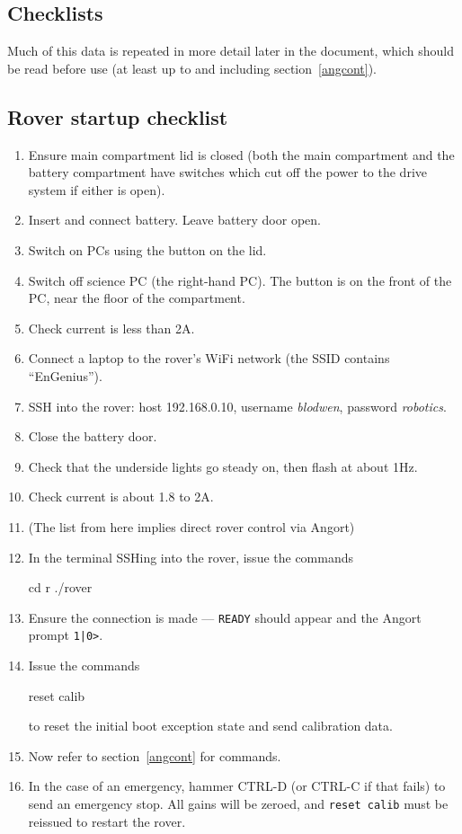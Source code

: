 \subsection{Checklists}
Much of this data is repeated in more detail later in the document,
which should be read before use (at least up to and including section~\ref{angcont}).
\subsection{Rover startup checklist}
\begin{enumerate}
\item Ensure main compartment lid is closed (both the main compartment
and the battery compartment have switches which cut off the power to
the drive system if either is open).
\item Insert and connect battery. Leave battery door open.
\item Switch on PCs using the button on the lid.
\item Switch off science PC (the right-hand PC). The button is on
the front of the PC, near the floor of the compartment.
\item Check current is less than 2A.
\item Connect a laptop to the rover's WiFi network (the SSID contains ``EnGenius'').
\item SSH into the rover: host 192.168.0.10, username \emph{blodwen}, password \emph{robotics}.
\item Close the battery door.
\item Check that the underside lights go steady on, then flash at about 1Hz.
\item Check current is about 1.8 to 2A.
\item (The list from here implies direct rover control via Angort)
\item In the terminal SSHing into the rover, issue the commands
\begin{v}
cd r
./rover
\end{v}
\item Ensure the connection is made --- \texttt{READY} should appear
and the Angort prompt \texttt{1|0>}.
\item Issue the commands
\begin{v}
reset calib
\end{v}
to reset the initial boot exception state and send calibration data.
\item Now refer to section~\ref{angcont} for commands.
\item In the case of an emergency, hammer CTRL-D (or CTRL-C if that
fails) to send an emergency stop. All gains will be zeroed, and 
\texttt{reset calib} must be reissued to restart the rover.
\end{enumerate}
